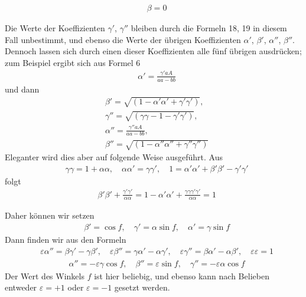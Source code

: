 \[
\begin{aligned}
&\beta=0
\end{aligned}
\]
\par Die Werte der Koeffizienten $\gamma'$, $\gamma''$ bleiben durch die Formeln 18, 19 in diesem Fall unbestimmt, und ebenso die Werte der übrigen Koeffizienten $\alpha'$, $\beta'$, $\alpha''$, $\beta''$. Dennoch lassen sich durch einen dieser Koeffizienten alle fünf übrigen ausdrücken; zum Beispiel ergibt sich aus Formel 6
\[
\begin{aligned}
&\alpha'=\frac{\gamma'aA}{aa-bb}
\end{aligned}
\]
und dann
\[
\begin{aligned}
&\beta'=\surd{(1-\alpha'\alpha'+\gamma'\gamma')},\\[6pt]
&
\gamma''=\surd{(\gamma\gamma-1-\gamma'\gamma')},\\[6pt]
&
\alpha''=\frac{\gamma''aA}{aa-bb},\\[6pt]
&
\beta''{}=\surd{(1-\alpha''\alpha''+\gamma''\gamma'')}
\end{aligned}
\]
Eleganter wird dies aber auf folgende Weise ausgeführt. Aus
\[
\begin{aligned}
&\gamma\gamma=1+\alpha\alpha,\quad
\alpha\alpha'=\gamma\gamma',\quad
1=\alpha'\alpha'+\beta'\beta'-\gamma'\gamma'
\end{aligned}
\]
folgt
\[
\begin{aligned}
&\beta'\beta'+\frac{\gamma'\gamma'}{\alpha\alpha}
=1-\alpha'\alpha'+\frac{\gamma\gamma\gamma'\gamma'}{\alpha\alpha}=1
\end{aligned}
\]
\par Daher können wir setzen
\[
\begin{aligned}
&\beta'=\cos f,\quad\gamma'=\alpha\sin f,\quad\alpha'=\gamma\sin f
\end{aligned}
\]
Dann finden wir aus den Formeln
\[
\begin{aligned}
&\varepsilon\alpha''=\beta\gamma'-\gamma\beta',\quad
\varepsilon\beta''=\gamma\alpha'-\alpha\gamma',\quad
\varepsilon\gamma''=\beta\alpha'-\alpha\beta',\quad
\varepsilon\varepsilon=1
\end{aligned}
\]
\[
\begin{aligned}
&\alpha''=-\varepsilon\gamma\cos f,\quad
\beta''=\varepsilon\sin f,\quad
\gamma''=-\varepsilon\alpha\cos f
\end{aligned}
\]
Der Wert des Winkels $f$ ist hier beliebig, und ebenso kann nach Belieben entweder $\varepsilon=+1$ oder $\varepsilon=-1$ gesetzt werden.

